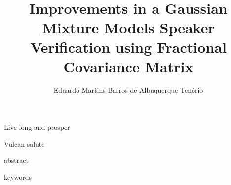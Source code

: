 \documentclass{gradpaper}
\institute{Centro de Informática}
\title{Improvements in a Gaussian Mixture Models Speaker Verification using
Fractional Covariance Matrix}
\author{Eduardo Martins Barros de Albuquerque Tenório}
\begin{document}

\frontpage
\presentationpage
\signatures

\acknowledgements{}

\epigraph{Live long and prosper}{Vulcan salute}

\abstract
abstract
\begin{keywords}
keywords
\end{keywords}

\afterpage{\frontmatterblankpage}
\listoffigures
\listoftables
\tableofcontents



\clearpage
\setcounter{page}{1}





%
%
%
%
\end{document}
